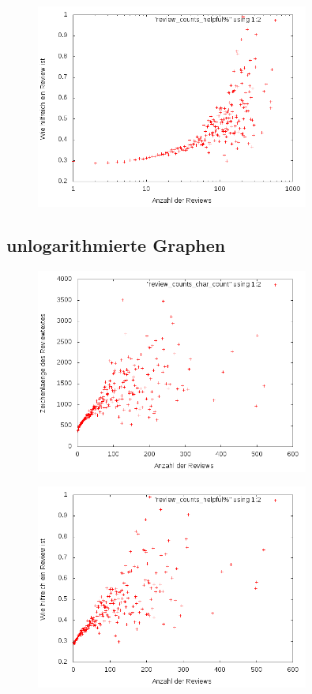 \documentclass{scrartcl}
\theoremstyle{my_th_style}
\begin{document}
\begin{figure}[H]
   \includegraphics[width=0.8\textwidth]{_results/helpfull_count2.png}
\end{figure}
\subsection*{unlogarithmierte Graphen}
\begin{figure}[H]
   \includegraphics[width=0.8\textwidth]{_results/charcount.png}
\end{figure}
\begin{figure}[H]
   \includegraphics[width=0.8\textwidth]{_results/helpfull_count.png}
\end{figure}
\end{document}
